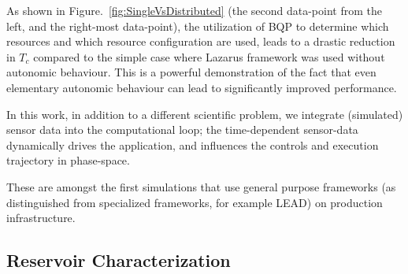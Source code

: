 \documentclass{acm_proc_article-sp}
\newcommand{\tc}{$T_c$ }
\newcommand{\jhanote}[1]{ {\textcolor{red} { ***Jha: #1 }}}
\newcommand{\yyenote}[1]{ {\textcolor{blue} { ***yye00: #1 }}}
\newcommand{\jhanote}[1]{}
\newcommand{\yyenote}[1]{}
\begin{document}
As shown in Figure.~\ref{fig:SingleVsDistributed} (the second
data-point from the left, and the right-most data-point), the 
utilization of BQP to determine which resources and which
resource configuration are used, leads to a drastic 
reduction in \tc compared to the simple case where Lazarus
framework was used without autonomic behaviour. This is 
a powerful demonstration of the fact that even elementary
autonomic behaviour can lead to significantly improved 
performance.


In this work, in addition to a different scientific problem, we
integrate (simulated) sensor data into the computational loop; the
time-dependent sensor-data dynamically drives the application, and
influences the controls and execution trajectory in phase-space.

These are amongst the first simulations
that use general purpose frameworks (as distinguished from specialized
frameworks, for example LEAD) on production infrastructure.

\subsection{Reservoir Characterization}
\end{document}
